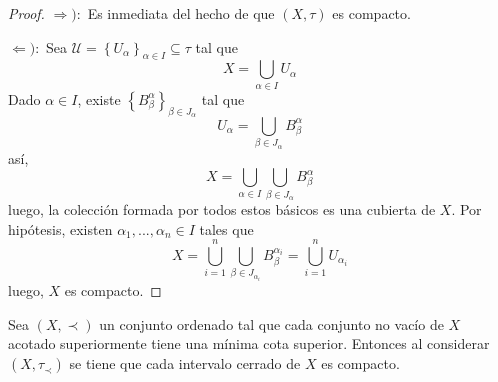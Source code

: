 \documentclass[12pt]{report}
\theoremstyle{largebreak}
\begin{document}
    \begin{proof}
        $\Rightarrow):$ Es inmediata del hecho de que $(X,\tau)$ es compacto.

        $\Leftarrow): $ Sea $\mathcal{U}=\left\{ U_\alpha\right\}_{\alpha\in I}\subseteq\tau$ tal que
        \begin{equation*}
            X=\bigcup_{\alpha\in I}U_\alpha
        \end{equation*}
        Dado $\alpha\in I$, existe $\left\{B_{\beta}^\alpha \right\}_{\beta\in J_\alpha}$ tal que
        \begin{equation*}
            U_\alpha=\bigcup_{ \beta\in J_\alpha}B_\beta^\alpha
        \end{equation*}
        así,
        \begin{equation*}
            X=\bigcup_{\alpha\in I}\bigcup_{\beta\in J_\alpha}B^{\alpha}_\beta
        \end{equation*}
        luego, la colección formada por todos estos básicos es una cubierta de $X$. Por hipótesis, existen $\alpha_1,...,\alpha_n\in I$ tales que
        \begin{equation*}
            X=\bigcup_{ i=1}^n \bigcup_{\beta\in J_{\alpha_i}}B_\beta^{\alpha_i}
            =\bigcup_{i =1}^n U_{\alpha_i}
        \end{equation*}
        luego, $X$ es compacto.
    \end{proof}

    \begin{propo}
        Sea $(X,\prec)$ un conjunto ordenado tal que cada conjunto no vacío de $X$ acotado superiormente tiene una mínima cota superior. Entonces al considerar $(X,\tau_{\prec})$ se tiene que cada intervalo cerrado de $X$ es compacto.
    \end{propo}
\end{document}
